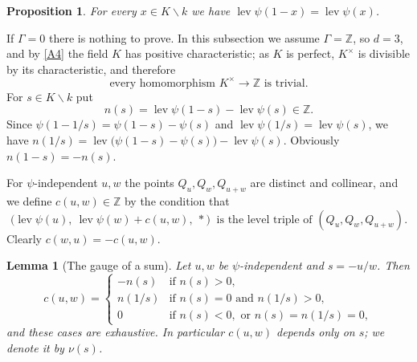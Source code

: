 \documentclass[11pt]{amsart}
\newtheorem{lemma}[theorem]{Lemma}
\newtheorem{proposition}[theorem]{Proposition}
\theoremstyle{definition}
\theoremstyle{remark}
\newcommand{\ZZ}{\mathbb{Z}}
\newcommand{\lev}{\operatorname{lev}}
\newcommand{\sm}{\smallsetminus}
\begin{document}
\begin{proposition}\label{prop:levels}
For every $x\in K\sm k$ we have $\lev\psi(1-x)=\lev\psi(x)$.
\end{proposition}

If $\Gamma=0$ there is nothing to prove. In this subsection we assume $\Gamma=\ZZ$, so $d=3$, and by \ref{A4} the field $K$ has positive characteristic; as $K$ is perfect, $K^\times$ is divisible by its characteristic, and therefore
\begin{equation}\label{eq:nohom}
\text{every homomorphism }K^\times\to\ZZ\text{ is trivial.}
\end{equation}
For $s\in K\sm k$ put
\[ n(s)=\lev\psi(1-s)-\lev\psi(s)\in\ZZ . \]
Since $\psi(1-1/s)=\psi(1-s)-\psi(s)$ and $\lev\psi(1/s)=\lev\psi(s)$, we have $n(1/s)=\lev\bigl(\psi(1-s)-\psi(s)\bigr)-\lev\psi(s)$. Obviously $n(1-s)=-n(s)$.

For $\psi$-independent $u,w$ the points $Q_u,Q_w,Q_{u+w}$ are distinct and collinear, and we define $c(u,w)\in\ZZ$ by the condition that
\begin{equation}\label{eq:defc}
\bigl(\lev\psi(u),\ \lev\psi(w)+c(u,w),\ \ast\bigr)\ \text{ is the level triple of }(Q_u,Q_w,Q_{u+w}).
\end{equation}
Clearly $c(w,u)=-c(u,w)$.

\begin{lemma}[The gauge of a sum]\label{lem:gauge}
Let $u,w$ be $\psi$-independent and $s=-u/w$. Then
\[ c(u,w)=\begin{cases}-n(s)&\text{if }n(s)>0,\\ n(1/s)&\text{if }n(s)=0\text{ and }n(1/s)>0,\\ 0&\text{if }n(s)<0,\text{ or }n(s)=n(1/s)=0,\end{cases} \]
and these cases are exhaustive. In particular $c(u,w)$ depends only on $s$; we denote it by $\nu(s)$.
\end{lemma}
\end{document}
